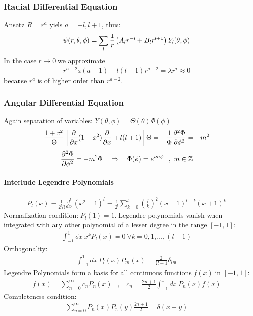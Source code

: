 \subsubsection{Radial Differential Equation}
Ansatz $R = r^a$ yiels $a = -l,l+1$, thus:
\begin{align*}
    \psi(r,\theta,\phi) = \sum_l \frac{1}{r} \left( A_l r^{-l} + B_l r^{l+1} \right) Y_l (\theta,\phi)
\end{align*}
In the case $r \rightarrow 0$ we approximate
\begin{align*}
    r^{a-2} a(a-1) - l(l+1) r^{a-2} = \lambda r^a \approx 0
\end{align*}
because $r^a$ is of higher order than $r^{a-2}$.

\subsubsection{Angular Differential Equation}
Again separation of variables: $Y(\theta,\phi) = \Theta(\theta) \Phi(\phi)$
\begin{align*}
    \frac{1+x^2}{\Theta} \left[ \frac{\partial}{\partial x} (1-x^2) \frac{\partial}{\partial x} + l(l+1) \right] \Theta
    = - \frac{1}{\Phi} \frac{\partial^2 \Phi}{\partial \phi^2}
    = - m^2
\end{align*}
\begin{align*}
    \frac{\partial^2 \Phi}{\partial \phi^2} = - m^2 \Phi
    \hspace{10pt} \Rightarrow \hspace{10pt}
    \Phi(\phi) = e^{i m \phi}
    \ \ , \ m \in \mathbb{Z}
\end{align*}

\paragraph{Interlude Legendre Polynomials}
\begin{align*}
    P_l (x) = \frac{1}{2^l l!} \frac{d^l}{d x^l} (x^2 - 1)^l
    = \frac{1}{2^l} \sum_{k=0}^l \binom{l}{k}^2 (x-1)^{l-k} (x+1)^k
\end{align*}
Normalization condition: $P_l (1) = 1$. Legendre polynomials vanish when
integrated with any other polynomial of a lesser degree in the range $[-1,1]$:
\begin{align*}
    \int_{-1}^1 dx \ x^k P_l (x) = 0 \ \forall k = 0,1,\dots,(l-1)
\end{align*}
Orthogonality:
\begin{align*}
    \int_{-1}^1 dx \ P_l (x) P_m (x) = \frac{2}{2l+1} \delta_{lm}
\end{align*}
Legendre Polynomials form a basis for all continuous functions $f(x)$ in
$[-1,1]$:
\begin{align*}
    f(x) = \sum_{n=0}^\infty c_n P_n (x)
    \hspace{10pt} , \hspace{10pt}
    c_n = \frac{2n+1}{2} \int_{-1}^1 dx \ P_n (x) f(x)
\end{align*}
Completeness condition:
\begin{align*}
    \sum_{n=0}^\infty P_n (x) P_n (y) \frac{2n+1}{2} = \delta (x-y)
\end{align*}

